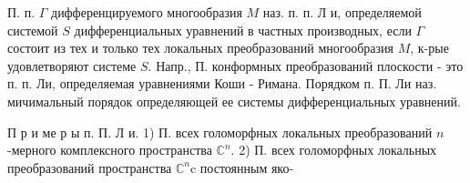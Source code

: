 \documentclass[10pt]{article}
\begin{document}
П. п. $\Gamma$ дифференцируемого многообразия $M$ наз. п. п. Л и, определяемой системой $S$ дифференциальных уравнений в частных производных, если $\Gamma$ состоит из тех и только тех локальных преобразований многообразия $M$, к-рые удовлетворяют системе $S$. Напр., П. конформных преобразований плоскости - это п. п. Ли, определяемая уравнениями Коши - Римана. Порядком п. П. Ли наз. мичимальный порядок определяющей ее системы дифференциальных уравнений.



П р и ме р ы п. П. Л и. 1) П. всех голоморфных локальных преобразований $n$-мерного комплексного пространства $\mathbb{C}^{n}$. 2) П. всех голоморфных локальных преобразований пространства $\mathbb{C}^{n} \mathrm{c}$ постоянным яко-
\end{document}
